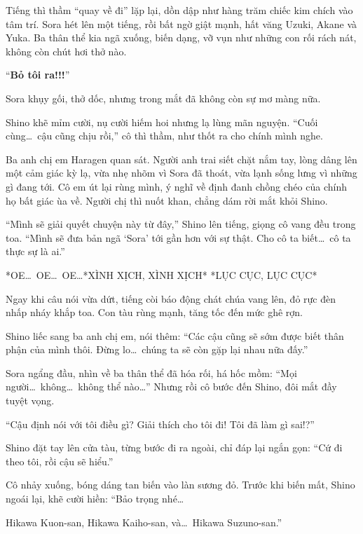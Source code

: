 \documentclass[../main.tex]{subfiles}
\begin{document}
Tiếng thì thầm ``quay về đi'' lặp lại, dồn dập như hàng trăm chiếc kim chích vào tâm trí. Sora hét lên một tiếng, rồi bất ngờ giật mạnh, hất văng Uzuki, Akane và Yuka. Ba thân thể kia ngã xuống, biến dạng, vỡ vụn như những con rối rách nát, không còn chút hơi thở nào.

``\textbf{Bỏ tôi ra!!!}''


Sora khụy gối, thở dốc, nhưng trong mắt đã không còn sự mơ màng nữa.

Shino khẽ mỉm cười, nụ cười hiếm hoi nhưng lạ lùng mãn nguyện. ``Cuối cùng\dots\ cậu cũng chịu rồi,'' cô thì thầm, như thốt ra cho chính mình nghe.

Ba anh chị em Haragen quan sát. Người anh trai siết chặt nắm tay, lòng dâng lên một cảm giác kỳ lạ, vừa nhẹ nhõm vì Sora đã thoát, vừa lạnh sống lưng vì những gì đang tới. Cô em út lại rùng mình, ý nghĩ về định đanh chồng chéo của chính họ bất giác ùa về. Người chị thì nuốt khan, chẳng dám rời mắt khỏi Shino.

``Mình sẽ giải quyết chuyện này từ đây,'' Shino lên tiếng, giọng cô vang đều trong toa. ``Mình sẽ đưa bản ngã `Sora' tới gần hơn với sự thật. Cho cô ta biết\dots\ cô ta thực sự là ai.''

*OE\dots\ OE\dots\ OE\dots* *XÌNH XỊCH, XÌNH XỊCH* *LỤC CỤC, LỤC CỤC*

Ngay khi câu nói vừa dứt, tiếng còi báo động chát chúa vang lên, đỏ rực đèn nhấp nháy khắp toa. Con tàu rùng mạnh, tăng tốc đến mức ghê rợn.

Shino liếc sang ba anh chị em, nói thêm: ``Các cậu cũng sẽ sớm được biết thân phận của mình thôi. Đừng lo\dots\ chúng ta sẽ còn gặp lại nhau nữa đấy.''

Sora ngẩng đầu, nhìn về ba thân thể đã hóa rối, há hốc mồm: ``Mọi người\dots\ không\dots\ không thể nào\dots'' Nhưng rồi cô bước đến Shino, đôi mắt đầy tuyệt vọng.

``Cậu định nói với tôi điều gì? Giải thích cho tôi đi! Tôi đã làm gì sai!?''


Shino đặt tay lên cửa tàu, từng bước đi ra ngoài, chỉ đáp lại ngắn gọn: ``Cứ đi theo tôi, rồi cậu sẽ hiểu.''

Cô nhảy xuống, bóng dáng tan biến vào làn sương đỏ. Trước khi biến mất, Shino ngoái lại, khẽ cười hiền: ``Bảo trọng nhé\dots

\begin{center}
    Hikawa Kuon-san, Hikawa Kaiho-san, và\dots\ Hikawa Suzuno-san.''
\end{center}
\end{document}
